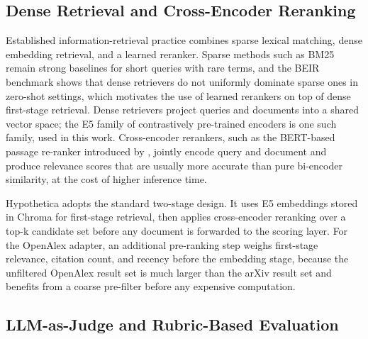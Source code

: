 \subsection{Dense Retrieval and Cross-Encoder Reranking}

Established information-retrieval practice combines sparse lexical matching, dense embedding retrieval, and a learned reranker. Sparse methods such as BM25 \citep{robertson2009bm25} remain strong baselines for short queries with rare terms, and the BEIR benchmark \citep{thakur2021beir} shows that dense retrievers do not uniformly dominate sparse ones in zero-shot settings, which motivates the use of learned rerankers on top of dense first-stage retrieval. Dense retrievers project queries and documents into a shared vector space; the E5 family of contrastively pre-trained encoders \citep{wang2022e5} is one such family, used in this work. Cross-encoder rerankers, such as the BERT-based passage re-ranker introduced by \citet{nogueira2019monobert}, jointly encode query and document and produce relevance scores that are usually more accurate than pure bi-encoder similarity, at the cost of higher inference time.

Hypothetica adopts the standard two-stage design. It uses E5 embeddings stored in Chroma \citep{chroma} for first-stage retrieval, then applies cross-encoder reranking over a top-k candidate set before any document is forwarded to the scoring layer. For the OpenAlex adapter, an additional pre-ranking step weighs first-stage relevance, citation count, and recency before the embedding stage, because the unfiltered OpenAlex result set is much larger than the arXiv result set and benefits from a coarse pre-filter before any expensive computation.

\subsection{LLM-as-Judge and Rubric-Based Evaluation}

